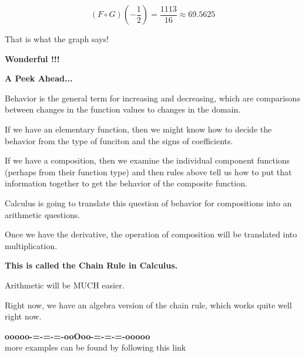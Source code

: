 \documentclass{ximera}
\begin{document}
\[
(F \circ G)\left( -\frac{1}{2} \right) = \frac{1113}{16} \approx 69.5625
\]

That is what the graph says! 


\begin{center}
\textbf{\textcolor{red!70!black}{Wonderful !!!}}
\end{center}










\textbf{\textcolor{red!70!black}{A Peek Ahead...}}


Behavior is the general term for increasing and decreasing, which are comparisons between changes in the function values to changes in the domain. 


If we have an elementary function, then we might know how to decide the behavior from the type of funciton and the signs of coefficients. 

If we have a composition, then we examine the individual component functions (perhaps from their function type) and then rules above tell us how to put that information together to get the behavior of the composite function.


Calculus is going to translate this question of behavior for compositions into an arithmetic questions.

Once we have the derivative, the operation of composition will be translated into multiplication.

\begin{center}

\textbf{\textcolor{red!70!black}{This is called the Chain Rule in Calculus.}}

\end{center}


Arithmetic will be MUCH easier.

Right now, we have an algebra version of the chain rule, which works quite well right now.



























\begin{center}
\textbf{\textcolor{green!50!black}{ooooo-=-=-=-ooOoo-=-=-=-ooooo}} \\

more examples can be found by following this link\\ 

\end{center}
\end{document}
